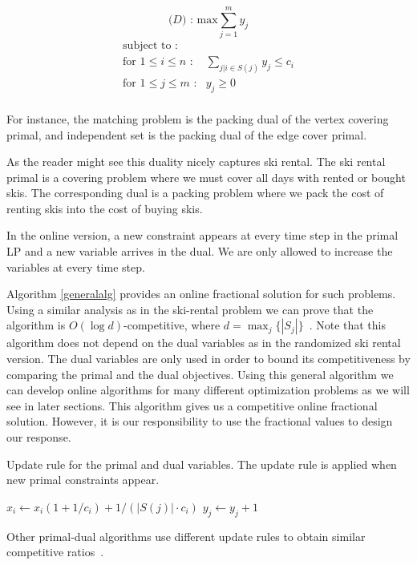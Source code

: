 \vspace{0.1cm}
\[
\textrm{($D$) : max}  \sum_{j=1}^m y_j
\]
\[
	\begin{array}{lr}
	\textrm{subject to :} & \\
	\textrm{for $1 \le i \le n$} \textrm{ :} & \sum_{j | i \in S(j)} y_j  \le c_i  \\
	\textrm{for $1 \le j \le m$} \textrm{ :} & y_j \ge 0  \\

	\end{array}
\]
\vspace{0.1cm}

For instance, the matching problem is the packing dual of the vertex covering primal, and independent set is the packing dual of the edge cover primal.

As the reader might see this duality nicely captures ski rental.
The ski rental primal is a covering problem where we must cover all days with rented or bought skis. 
The corresponding dual is a packing problem where we pack the cost of renting skis into the cost of buying skis.

In the online version, a new constraint appears at every time step in the primal LP and a new variable arrives in the dual. We are only allowed to increase the variables at every time step.

Algorithm \ref{generalalg} provides an online fractional solution for such problems. Using a similar analysis as in the ski-rental problem we can prove that the algorithm is $O(\log d)$-competitive, where \mbox{$d = \max_j\{|S_j|\}$}~\cite{buchbinder09:survey}.
Note that this algorithm does not depend on the dual variables as in the randomized ski rental version. The dual variables are only used in order to bound its competitiveness by comparing the primal and the dual objectives.
Using this general algorithm we can develop online algorithms for many different optimization problems as we will see in later sections. This algorithm gives us a competitive online fractional solution. However, it is our responsibility to use the fractional values to design our response.

\begin{algorithm}
\caption{Update rule for the primal and dual variables. The update rule is applied when new primal constraints appear.}
\label{generalalg}
\begin{algorithmic}[1]
    \STATE $x_i \leftarrow x_i (1 + 1/c_i) + 1/(|S(j)| \cdot c_i)$ 
  \ENDFOR
  \STATE $y_j \leftarrow y_j + 1$
\ENDWHILE
\end{algorithmic}
\end{algorithm}

Other primal-dual algorithms use different update rules to obtain similar competitive ratios~\cite{buchbinder09:survey}.
